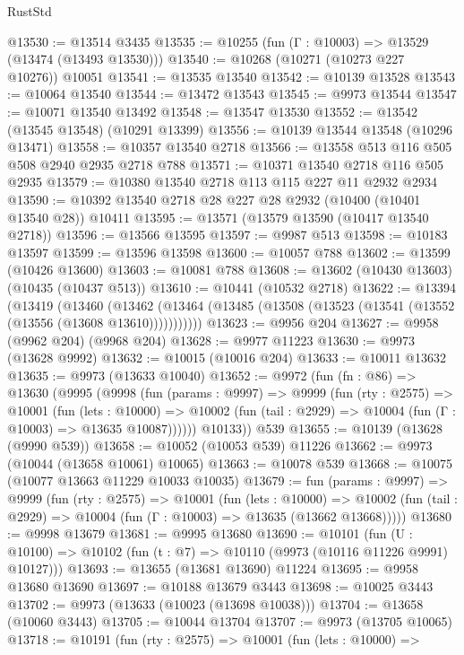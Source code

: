 \begin{lexlean}{RustStd}
\begin{coremodule}
@13530 := @13514 @3435
@13535 := @10255 (fun (Γ : @10003) => @13529 (@13474 (@13493 @13530)))
@13540 := @10268 (@10271 (@10273 @227 @10276)) @10051
@13541 := @13535 @13540
@13542 := @10139 @13528
@13543 := @10064 @13540
@13544 := @13472 @13543
@13545 := @9973 @13544
@13547 := @10071 @13540 @13492
@13548 := @13547 @13530
@13552 := @13542 (@13545 @13548) (@10291 @13399)
@13556 := @10139 @13544 @13548 (@10296 @13471)
@13558 := @10357 @13540 @2718
@13566 := @13558 @513 @116 @505 @508 @2940 @2935 @2718 @788
@13571 := @10371 @13540 @2718 @116 @505 @2935
@13579 := @10380 @13540 @2718 @113 @115 @227 @11 @2932 @2934
@13590 := @10392 @13540 @2718 @28 @227 @28 @2932 (@10400 (@10401 @13540 @28)) @10411
@13595 := @13571 (@13579 @13590 (@10417 @13540 @2718))
@13596 := @13566 @13595
@13597 := @9987 @513
@13598 := @10183 @13597
@13599 := @13596 @13598
@13600 := @10057 @788
@13602 := @13599 (@10426 @13600)
@13603 := @10081 @788
@13608 := @13602 (@10430 @13603) (@10435 (@10437 @513))
@13610 := @10441 (@10532 @2718)
@13622 := @13394
    (@13419
      (@13460
        (@13462 (@13464 (@13485 (@13508 (@13523 (@13541 (@13552 (@13556 (@13608 @13610)))))))))))
@13623 := @9956 @204
@13627 := @9958 (@9962 @204) (@9968 @204)
@13628 := @9977 @11223
@13630 := @9973 (@13628 @9992)
@13632 := @10015 (@10016 @204)
@13633 := @10011 @13632
@13635 := @9973 (@13633 @10040)
@13652 := @9972
    (fun (fn : @86) =>
    @13630
      (@9995
        (@9998
          (fun (params : @9997) =>
          @9999
            (fun (rty : @2575) =>
            @10001
              (fun (lets : @10000) =>
              @10002 (fun (tail : @2929) => @10004 (fun (Γ : @10003) => @13635 @10087))))))
        @10133))
    @539
@13655 := @10139 (@13628 (@9990 @539))
@13658 := @10052 (@10053 @539) @11226
@13662 := @9973 (@10044 (@13658 @10061) @10065)
@13663 := @10078 @539
@13668 := @10075 (@10077 @13663 @11229 @10033 @10035)
@13679 := fun (params : @9997) =>
  @9999
    (fun (rty : @2575) =>
    @10001
      (fun (lets : @10000) =>
      @10002 (fun (tail : @2929) => @10004 (fun (Γ : @10003) => @13635 (@13662 @13668)))))
@13680 := @9998 @13679
@13681 := @9995 @13680
@13690 := @10101
    (fun (U : @10100) => @10102 (fun (t : @7) => @10110 (@9973 (@10116 @11226 @9991) @10127)))
@13693 := @13655 (@13681 @13690) @11224
@13695 := @9958 @13680 @13690
@13697 := @10188 @13679 @3443
@13698 := @10025 @3443
@13702 := @9973 (@13633 (@10023 (@13698 @10038)))
@13704 := @13658 (@10060 @3443)
@13705 := @10044 @13704
@13707 := @9973 (@13705 @10065)
@13718 := @10191
    (fun (rty : @2575) =>
    @10001
      (fun (lets : @10000) =>

\end{coremodule}
\end{lexlean}
